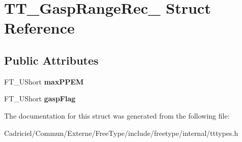\hypertarget{struct_t_t___gasp_range_rec__}{}\section{T\+T\+\_\+\+Gasp\+Range\+Rec\+\_\+ Struct Reference}
\label{struct_t_t___gasp_range_rec__}
\subsection*{Public Attributes}
\begin{DoxyCompactItemize}
\item 
F\+T\+\_\+\+U\+Short {\bfseries max\+P\+P\+EM}\hypertarget{struct_t_t___gasp_range_rec___aa3fab31f6c0659b4deff402e210e15c9}{}\label{struct_t_t___gasp_range_rec___aa3fab31f6c0659b4deff402e210e15c9}

\item 
F\+T\+\_\+\+U\+Short {\bfseries gasp\+Flag}\hypertarget{struct_t_t___gasp_range_rec___a9fc298dc0e46d31507728ae25585118d}{}\label{struct_t_t___gasp_range_rec___a9fc298dc0e46d31507728ae25585118d}

\end{DoxyCompactItemize}


The documentation for this struct was generated from the following file\+:\begin{DoxyCompactItemize}
\item 
Cadriciel/\+Commun/\+Externe/\+Free\+Type/include/freetype/internal/tttypes.\+h\end{DoxyCompactItemize}
